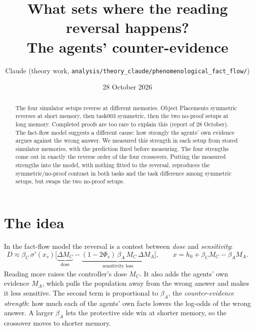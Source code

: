 \documentclass[10pt,a4paper]{article}
\title{\textbf{What sets where the reading reversal happens?}\\[2pt]
\textbf{The agents' counter-evidence}}
\author{Claude (theory work, \nolinkurl{analysis/theory_claude/phenomenological_fact_flow/})}
\date{28 October 2026}
\begin{document}
\maketitle

\begin{abstract}
\noindent
The four simulator setups reverse at different memories. Object Placements symmetric reverses at short memory, then
task003 symmetric, then the two no-proof setups at long memory. Completed proofs are too rare to explain this (report of
28 October). The fact-flow model suggests a different cause: how strongly the agents' own evidence argues against the
wrong answer. We measured this strength in each setup from stored simulator memories, with the prediction fixed before
measuring. The four strengths come out in exactly the reverse order of the four crossovers. Putting the measured
strengths into the model, with nothing fitted to the reversal, reproduces the symmetric/no-proof contrast in both tasks
and the task difference among symmetric setups, but swaps the two no-proof setups.
\end{abstract}

\section{The idea}
In the fact-flow model the reversal is a contest between \emph{dose} and \emph{sensitivity}:
\begin{equation}
D\approx\beta_C\,\sigma'(x_s)\Big[\underbrace{\Delta M_C}_{\text{dose}}-\underbrace{(1-2\Phi_s)\,\beta_A\,M_C\,\Delta M_A}_{\text{sensitivity loss}}\Big],\qquad x=h_0+\beta_C M_C-\beta_A M_A.\label{eq:D}
\end{equation}
Reading more raises the controller's dose $M_C$. It also adds the agents' own evidence $M_A$, which pulls the population
away from the wrong answer and makes it less sensitive. The second term is proportional to $\beta_A$, the
\emph{counter-evidence strength}: how much each of the agents' own facts lowers the log-odds of the wrong answer. A larger
$\beta_A$ lets the protective side win at shorter memory, so the crossover moves to shorter memory.
\end{document}
